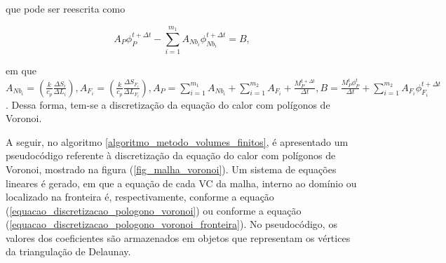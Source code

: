 \noindent que pode ser reescrita como

\begin{equation}
 A_{P} \phi_{P}^{t+ \Delta t} - \sum_{i=1}^{m_1} A_{Nb_{i}} \phi_{Nb_{i}}^{t+ \Delta t}  = B,
 \label{equacao_discretizacao_pologono_voronoi_fronteira} 
\end{equation}

\noindent em que $A_{Nb_{i}} = \left( \frac{k} {c_{p}}  \frac {\Delta S_{i}} {\Delta L_{i}} \right), A_{F_{i}} = \left( \frac{k} {c_{p}}  \frac {\Delta S_{F_{i}}} {\Delta L_{F_{i}}} \right), A_{P} = \sum_{i=1}^{m_1} A_{Nb_{i}} + \sum_{i=1}^{m_2} A_{F_{i}} + \frac { M_{P}^{t+ \Delta t} } { \Delta t}, B = \frac {M_{P}^{t} \phi_{P}^{t}} { \Delta t} + \sum_{i=1}^{m_2} A_{F_{i}} \phi_{F_{i}}^{t+ \Delta t}$. Dessa forma, tem-se a discretização da equação do calor com polígonos de Voronoi.

A seguir, no algoritmo \ref{algoritmo_metodo_volumes_finitos}, é apresentado um pseudocódigo referente à discretização da equação do calor com polígonos de Voronoi, mostrado na figura (\ref{fig_malha_voronoi}). Um sistema de equações lineares é gerado, em que a equação de cada VC da malha, interno ao domínio ou localizado na fronteira é, respectivamente, conforme a equação (\ref{equacao_discretizacao_pologono_voronoi}) ou conforme a equação (\ref{equacao_discretizacao_pologono_voronoi_fronteira}).  No pseudocódigo, os valores dos coeficientes são armazenados em objetos que representam os vértices da triangulação de Delaunay. 

